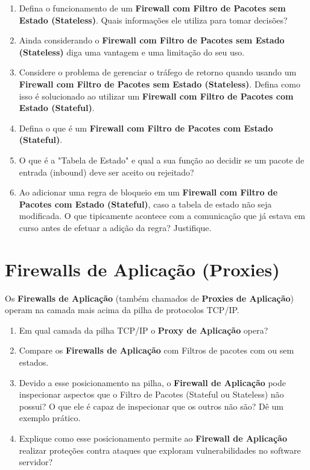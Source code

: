 \begin{enumerate}
    \item Defina o funcionamento de um \textbf{Firewall com Filtro de Pacotes sem Estado (Stateless)}. Quais informações ele utiliza para tomar decisões?
    \item Ainda considerando o \textbf{Firewall com Filtro de Pacotes sem Estado (Stateless)} diga uma vantagem e uma limitação do seu uso.
    \item Considere o problema de gerenciar o tráfego de retorno quando usando um  \textbf{Firewall com Filtro de Pacotes sem Estado (Stateless)}. Defina como isso é solucionado ao utilizar um  \textbf{Firewall com Filtro de Pacotes com Estado (Stateful)}.
    \item Defina o que é um \textbf{Firewall com Filtro de Pacotes com Estado (Stateful)}.
    \item O que é a "Tabela de Estado" e qual a sua função ao decidir se um pacote de entrada (inbound) deve ser aceito ou rejeitado?
    \item Ao adicionar uma regra de bloqueio em um \textbf{Firewall com Filtro de Pacotes com Estado (Stateful)}, caso a tabela de estado não seja modificada. O que tipicamente acontece com a comunicação que já estava em curso antes de efetuar a adição da regra? Justifique.
\end{enumerate}

\section{Firewalls de Aplicação (Proxies)}
Os \textbf{Firewalls de Aplicação} (também chamados de \textbf{Proxies de Aplicação}) operam na camada mais acima da pilha de protocolos TCP/IP.

\begin{enumerate}
    \item Em qual camada da pilha TCP/IP o \textbf{Proxy de Aplicação} opera?
    \item Compare os \textbf{Firewalls de Aplicação} com Filtros de pacotes com ou sem estados.
    \item Devido a esse posicionamento na pilha, o \textbf{Firewall de Aplicação} pode inspecionar aspectos que o Filtro de Pacotes (Stateful ou Stateless) não possui? O que ele é capaz de inspecionar que os outros não são? Dê um exemplo prático.
    \item Explique como esse posicionamento permite ao \textbf{Firewall de Aplicação} realizar proteções contra ataques que exploram vulnerabilidades no software servidor?
\end{enumerate}

